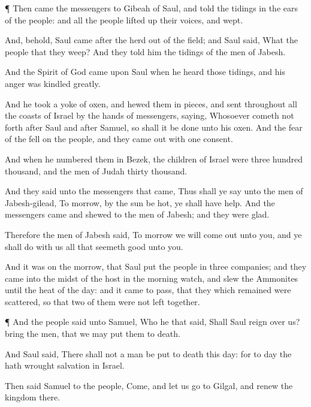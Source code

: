 {\par }{\PP {}¶ Then
came the
messengers to
Gibeah of
Saul, and
told the
tidings in the
ears of the
people: and all the
people lifted
up their
voices, and
wept.


\par }{\PP {}And, behold,
Saul
came
after the
herd out of the
field; and
Saul
said, What
{} the
people that they
weep? And they
told him the
tidings of the
men of
Jabesh.

And the
Spirit of
God
came upon
Saul when he
heard those
tidings, and his
anger was
kindled
greatly.

And he
took a
yoke of
oxen, and hewed them in
pieces, and
sent
{} throughout all the
coasts of
Israel by the
hands of
messengers,
saying, Whosoever cometh not
forth
after
Saul and
after
Samuel, so shall it be
done unto his
oxen. And the
fear of the
{}
fell on the
people, and they came
out with
one
consent.

And when he
numbered them in
Bezek, the
children of
Israel were
three
hundred
thousand, and the
men of
Judah
thirty
thousand.

And they
said unto the
messengers that
came, Thus shall ye
say unto the
men of
Jabesh-gilead, To
morrow, by
{} the
sun be
hot, ye shall have
help. And the
messengers
came and
shewed
{} to the
men of
Jabesh; and they were
glad.

Therefore the
men of
Jabesh
said, To
morrow we will come
out unto you, and ye shall
do with us all that
seemeth
good unto you.

And it was
{} on the
morrow, that
Saul
put the
people in
three
companies; and they
came into the
midst of the
host in the
morning
watch, and
slew the
Ammonites until the
heat of the
day: and it came to pass, that they which
remained were
scattered, so that
two of them were not
left
together.


\par }{\PP {}¶ And the
people
said unto
Samuel, Who
{} he that
said, Shall
Saul
reign over us?
bring the
men, that we may put them to
death.

And
Saul
said, There shall not a
man be put to
death this
day: for to
day the
{} hath
wrought
salvation in
Israel.

Then
said
Samuel to the
people,
Come, and let us
go to
Gilgal, and
renew the
kingdom there.

}
